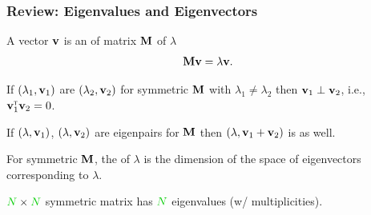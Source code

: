 \documentclass{beamer}
\begin{document}
\begin{frame}
\frametitle{Review: Eigenvalues and Eigenvectors}

A vector $\mathbf{v}$ is an  of matrix $\mathbf{M}$ of 
$\lambda$ 
\vspace{-0.1cm}
$$\mathbf{M}\mathbf{v} = \lambda\mathbf{v}.$$ 
\vspace{-0.8cm}
\pause

\begin{block}{}
If $(\lambda_1,\mathbf{v}_1)$ are $(\lambda_2,\mathbf{v}_2)$ 
for symmetric $\mathbf{M}$  with $\lambda_1 \ne \lambda_2$ then 
$\mathbf{v}_1 \perp \mathbf{v}_2$, i.e., $\mathbf{v}_1^\mathsf{\scriptscriptstyle T} \mathbf{v}_2 = 0$. \\
\end{block}
\pause
{} 
\pause
\begin{block}{}
If $(\lambda,\mathbf{v}_1)$, $(\lambda,\mathbf{v}_2)$ are eigenpairs
for $\mathbf{M}$ then $(\lambda,\mathbf{v}_1 + \mathbf{v}_2)$ is as well.\\
\end{block}
\pause
\begin{block}{}
For symmetric $\mathbf{M}$, the  of $\lambda$ is the dimension of the 
space of eigenvectors corresponding to $\lambda$.
\end{block}

\begin{block}{}
$\nodes \times \nodes$ symmetric matrix has $\nodes$ eigenvalues (w/ multiplicities).
\end{block}

\end{frame}
\end{document}
